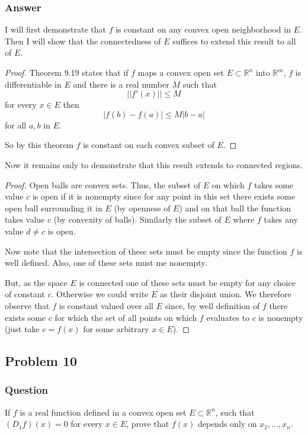 \documentclass[12pt]{article}
\begin{document}
\subsubsection{Answer}
I will first demonstrate that $f$ is constant on any convex open neighborhood in $E$. Then I will show that the connectedness of $E$ suffices to extend this result to all of $E$. 

\begin{proof}
Theorem 9.19 states that if $f$ maps a convex open set $E \subset \mathbb{R}^n$ into $\mathbb{R}^m$, $f$ is differentiable in $E$ and there is a real number $M$ such that 
\[||f'(x)||\leq M\]
 for every $x \in E $ then 
\[|f(b)-f(a)| \leq M |b-a|\] for all $a, b$ in $E$.

So by this theorem $f$ is constant on each convex subset of $E$.
\end{proof}

Now it remains only to demonstrate that this result extends to connected regions. 

\begin{proof}
Open balls are convex sets.  Thus, the subset of $E$ on which $f$ takes some value $c$ is open if it is nonempty since for any point in this set there exists some open ball surrounding it in $E$ (by openness of $E$) and on that ball the function takes value $c$ (by convexity of balls). Similarly the subset of $E$ where $f$ takes any value $d\neq c$ is open.

Now note that the intersection of these sets must be empty since the function $f$ is well defined. Also, one of these sets must me nonempty.

But, as the space $E$ is connected one of these sets must be empty for any choice of constant $c$. Otherwise we could write $E$ as their disjoint union. We therefore observe that $f$ is constant valued over all $E$ since, by well definition of $f$ there exists some $c$ for which the set of all points on which $f$ evaluates to $c$ is nonempty (just take $c=f(x)$ for some arbitrary $x \in E$).
\end{proof}
\subsection{Problem 10}

\subsubsection{Question}
If $f$ is a real function defined in a convex open set $E \subset \mathbb{R}^n$, such that $(D_1 f)(x)=0$ for every $x \in E$, prove that $f(x)$ depends only on $x_2, \dots, x_n$.
\end{document}
